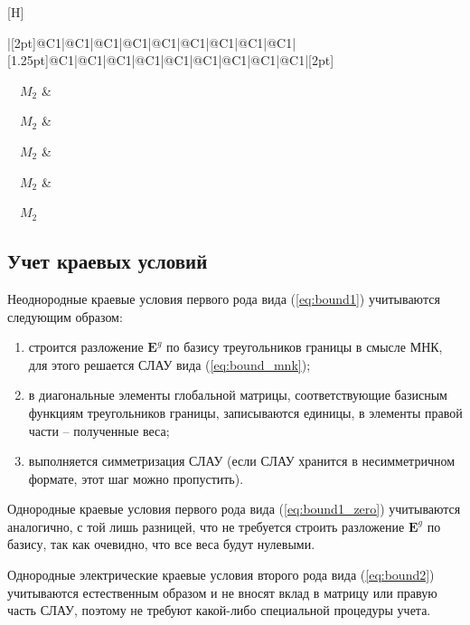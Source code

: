 \documentclass[a4paper,14pt]{article}
\makeatletter
\renewenvironment{figure}[1][\fps@figure]{
  \edef\@tempa{\noexpand\@float{figure}[#1]}
  \@tempa
  \addtocounter{foofigure}{1}
}{
  \end@float
}
\makeatother
\begin{document}
\begin{figure}[H]
\begin{spacing}{0.75}
\begin{tabu}{|[2pt]@{}C{1}|@{}C{1}|@{}C{1}|@{}C{1}|@{}C{1}|@{}C{1}|@{}C{1}|@{}C{1}|@{}C{1}|[1.25pt]@{}C{1}|@{}C{1}|@{}C{1}|@{}C{1}|@{}C{1}|@{}C{1}|@{}C{1}|@{}C{1}|@{}C{1}|[2pt]}
			~\vspace{-1ex}\par~~\small $\scriptscriptstyle M_{2}$ &
			~\vspace{-1ex}\par~~\small $\scriptscriptstyle M_{2}$ &
			~\vspace{-1ex}\par~~\small $\scriptscriptstyle M_{2}$ &
			~\vspace{-1ex}\par~~\small $\scriptscriptstyle M_{2}$ &
			~\vspace{-1ex}\par~~\small $\scriptscriptstyle M_{2}$
		\\[0.25ex]\tabucline[2pt]{-}
	\end{tabu}
	\end{spacing}
	\vspace{1ex}
	\caption{структура СЛАУ}
	\label{fig:theory:matrx_structure}
\end{figure}


\subsection{Учет краевых условий}

Неоднородные краевые условия первого рода вида (\ref{eq:bound1}) учитываются следующим образом:
\begin{enumerate}
	\item строится разложение $\mathbf{E}^g$ по базису треугольников границы в смысле МНК, для этого решается СЛАУ вида (\ref{eq:bound_mnk});
	\item в диагональные элементы глобальной матрицы, соответствующие базисным функциям треугольников границы, записываются единицы, в элементы правой части -- полученные веса;
	\item выполняется симметризация СЛАУ (если СЛАУ хранится в несимметричном формате, этот шаг можно пропустить).
\end{enumerate}

Однородные краевые условия первого рода вида (\ref{eq:bound1_zero}) учитываются аналогично, с той лишь разницей, что не требуется строить разложение $\mathbf{E}^g$ по базису, так как очевидно, что все веса будут нулевыми.

Однородные электрические краевые условия второго рода вида (\ref{eq:bound2}) учитываются естественным образом и не вносят вклад в матрицу или правую часть СЛАУ, поэтому не требуют какой-либо специальной процедуры учета.
\end{document}
